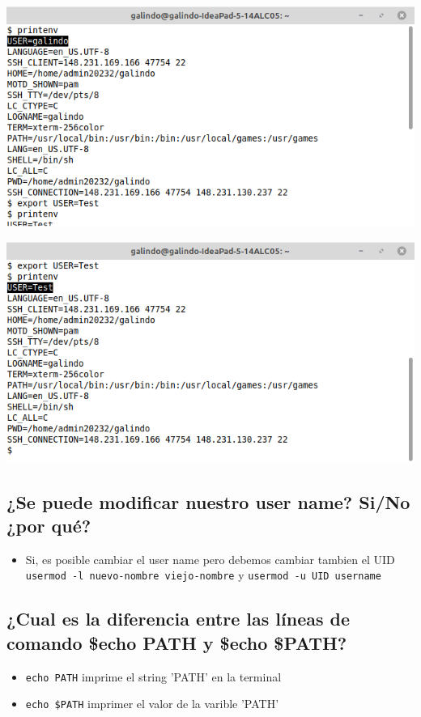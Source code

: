 \documentclass[11pt]{article}
\begin{document}
\begin{twoc}
\begin{center}
\includegraphics[width=.9\linewidth]{img/3a.png}
\end{center}
\end{twoc}
\begin{twoc}
\begin{center}
\includegraphics[width=.9\linewidth]{img/3b.png}
\end{center}
\end{twoc}

\subsection{¿Se puede modificar nuestro user name? Si/No ¿por qué?}
\label{sec:org6ce90e4}
\begin{itemize}
\item \autocite{Pablinux_2019} Si, es posible cambiar el user name pero debemos cambiar tambien el UID \texttt{usermod -l nuevo-nombre viejo-nombre} y \texttt{usermod -u UID username}
\end{itemize}
\pagebreak

\subsection{¿Cual es la diferencia entre las líneas de comando \$echo PATH y \$echo \$PATH?}
\label{sec:org7f34952}
\begin{itemize}
\item \texttt{echo PATH} imprime el string 'PATH' en la terminal
\item \texttt{echo \$PATH} imprimer el valor de la varible 'PATH'
\end{itemize}
\end{document}

